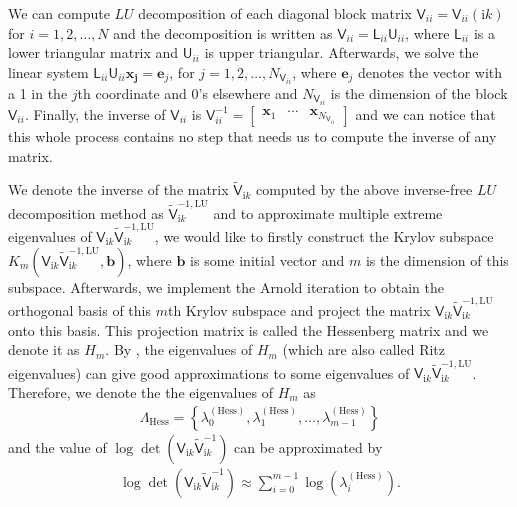 We can compute $LU$ decomposition of each diagonal block matrix $\mathsf{V}_{ii} = \mathsf{V}_{ii}(\mathrm{i}k)$ for $i = 1, 2, \dots, N$ and the decomposition is 
written as $\mathsf{V}_{ii} = \mathsf{L}_{ii}\mathsf{U}_{ii} $, where $\mathsf{L}_{ii}$ is a lower triangular matrix and $\mathsf{U}_{ii}$ is upper triangular.
Afterwards, we solve the linear system $\mathsf{L}_{ii}\mathsf{U}_{ii}\boldsymbol{x_{j}} = \boldsymbol{e}_{j}$, for $j = 1, 2, \dots, N_{\mathsf{V}_{ii}}$, where $\boldsymbol{e}_{j}$ 
denotes the vector with a 1 in the $j$th coordinate and 0's elsewhere and $N_{\mathsf{V}_{ii}}$ is the dimension of the block $\mathsf{V}_{ii}$. Finally, the inverse of $\mathsf{V}_{ii}$ is 
$\mathsf{V}_{ii}^{-1} = \begin{bmatrix}
    \boldsymbol{x}_{1} & \cdots & \boldsymbol{x}_{N_{\mathsf{V}_{ii}}}
\end{bmatrix}$ and we can notice that this whole process contains no step that needs us to compute the inverse of any matrix. 

We denote the inverse of the matrix $\tilde{\mathsf{V}}_{\mathrm{i}k}$ computed by the above inverse-free $LU$ decomposition method as 
$\tilde{\mathsf{V}}_{\mathrm{i}k}^{-1,\text{LU}}$ and to approximate multiple extreme eigenvalues of 
$\mathsf{V}_{\mathrm{i}k}\tilde{\mathsf{V}}_{\mathrm{i}k}^{-1,\text{LU}}$, we would like to firstly construct the Krylov subspace  
$K_{m}(\mathsf{V}_{\mathrm{i}k}\tilde{\mathsf{V}}_{\mathrm{i}k}^{-1,\text{LU}}, \boldsymbol{b})$, where $\boldsymbol{b}$ is some 
initial vector and $m$ is the dimension of this subspace. Afterwards, we implement the Arnold iteration to obtain the orthogonal basis of this $m$th Krylov 
subspace and project the matrix $\mathsf{V}_{\mathrm{i}k}\tilde{\mathsf{V}}_{\mathrm{i}k}^{-1,\text{LU}}$ onto this basis. 
This projection matrix is called the Hessenberg matrix and we denote it as $H_{m}$. By \cite{saad2011numerical}, the eigenvalues of $H_{m}$ (which are also 
called Ritz eigenvalues) can give good approximations to some eigenvalues of $\mathsf{V}_{\mathrm{i}k}\tilde{\mathsf{V}}_{\mathrm{i}k}^{-1,\text{LU}}$.
Therefore, we denote the the eigenvalues of $H_{m}$ as 
\begin{align}\label{Eigenvalues of Hessenberg}
    \Lambda_{\text{Hess}} = \left\{\lambda_{0}^{(\text{Hess})}, \lambda_{1}^{(\text{Hess})}, \dots, \lambda_{m-1}^{(\text{Hess})}\right\}
\end{align}
and the value of  $\log\det(\mathsf{V}_{\mathrm{i}k}\tilde{\mathsf{V}}_{\mathrm{i}k}^{-1})$ can be approximated by
\begin{align*}
    \log\det(\mathsf{V}_{\mathrm{i}k}\tilde{\mathsf{V}}_{\mathrm{i}k}^{-1}) \approx \sum_{i = 0}^{m-1}\log\left(\lambda_{i}^{(\text{Hess})}\right).
\end{align*}




